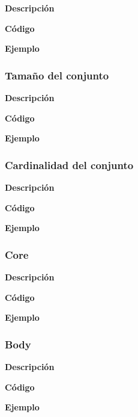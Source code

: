     \textbf{Descripci\'on}


    \textbf{C\'odigo}


    \textbf{Ejemplo}


\subsubsection{Tama\~no del conjunto}

    \textbf{Descripci\'on}


    \textbf{C\'odigo}


    \textbf{Ejemplo}



\subsubsection{Cardinalidad del conjunto}

    \textbf{Descripci\'on}


    \textbf{C\'odigo}


    \textbf{Ejemplo}




\subsubsection{Core}

    \textbf{Descripci\'on}


    \textbf{C\'odigo}


    \textbf{Ejemplo}




\subsubsection{Body}

    \textbf{Descripci\'on}


    \textbf{C\'odigo}


    \textbf{Ejemplo}


